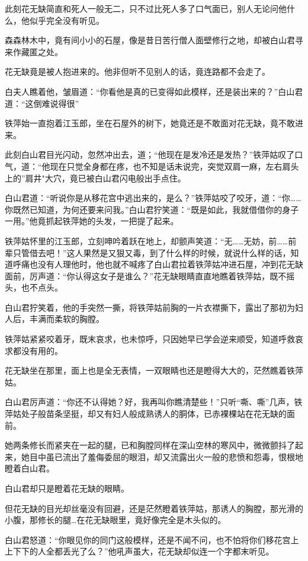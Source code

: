 \documentclass[12pt,oneside]{book}
\begin{document}
此刻花无缺简直和死人一般无二，只不过比死人多了口气面已，别人无论问他什么，他似乎完全没有听见。

森森林木中，竟有间小小的石屋，像是昔日苦行僧人面壁修行之地，却被白山君寻来作藏匿之处。

花无缺竟是被人抱进来的。他非但听不见别人的话，竟连路都不会走了。

白夫人瞧着他，皱眉道：``你看他是真的已变得如此模样，还是装出来的？''白山君道：``这倒难说得很''

铁萍始一直抱着江玉郎，坐在石屋外的树下，她竟还是不敢面对花无缺，竟不敢进来。

此刻白山君目光闪动，忽然冲出去，道；``他现在是发冷还是发热？''铁萍姑叹了口气，道：``他现在只觉全身都在疼，也不知是话未说完，突觉双肩一麻，左右肩头上的''肩井"大穴，竟已被白山君闪电般出手点住。

白山君道：``听说你是从移花宫中逃出来的，是么？''铁萍姑咬了咬牙，道：``你\ldots\ldots 你既然已知道，为何还要来问我。''白山君狞笑道：``既是如此，我就借借你的身子一用。''他竟抓起铁萍她的头发，一把提了起来。

铁萍姑怀里的江玉郎，立刻呻吟着跃在地上，却颤声笑道：``无\ldots\ldots 无妨，前\ldots\ldots 前辈只管借去吧！''这人果然是又狠又毒，到了什么样的时候，就说什么样的话，知道呼痛也没有人理他时，他也就不喊疼了白山君拉着铁萍姑冲进石屋，冲到花无缺面前，厉声道：``你认得这女子是谁么？''花无缺眼睛直直地瞧着铁萍姑，既不摇头，也不点头。

白山君狞笑着，他的手突然一撕，将铁萍姑前胸的一片衣襟撕下，露出了那初为妇人后，丰满而柔软的胸膛。

铁萍姑紧紧咬着牙，既末哀求，也未惊呼，只因她早已学会逆来顺受，知道呼救哀求都没有用的。

花无缺坐在那里，面上也是全无表情，一双眼睛也还是瞪得大大的，茫然瞧着铁萍姑。

白山君厉声道：``你还不认得她？好，我再叫你瞧清楚些！''只听``嘶、嘶''几声，铁萍姑处子般苗条坚挺，却又有妇人般成熟诱人的胴体，已赤裸棵站在花无缺的面前。

她两条修长而紧夹在一起的腿，已和胸膛同样在深山空林的寒风中，微微颤抖了起来，她目中虽已流出了羞侮委屈的眼泪，却又流露出火一般的悲愤和怨毒，恨根地瞪着白山君。

白山君却只是瞪着花无缺的眼睛。

但花无缺的目光却丝毫没有回避，还是茫然瞪着铁萍姑，那诱人的胸膛，那光滑的小腹，那修长的腿\ldots 在花无缺眼里，竟好像完全是木头似的。

白山君怒道：``你眼见你的同门这般模样，还是不闻不问，也不怕将你们移花宫上上下下的人全都丢光了么？''他吼声虽大，花无缺却似连一个字都末听见。
\end{document}

